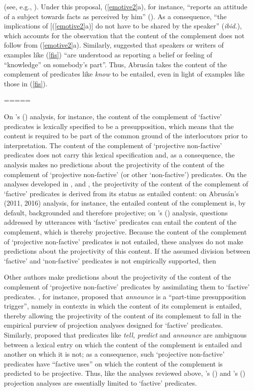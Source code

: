 \documentclass[11pt,fleqn]{article}
\newcommand{\6}{\mbox{$[\hspace*{-.6mm}[$}}
\newcommand{\9}{\mbox{$]\hspace*{-.6mm}]$}}
\newcommand{\citetpos}[1]{\citeauthor{#1}'s (\citeyear{#1})}
\begin{document}
{ (see, e.g., \citealt{eckardt2014}). Under this proposal, (\ref{emotive2}a), for instance, ``reports an attitude of a subject towards facts as perceived by him'' (\citealt[514]{abrusan2011}). As a consequence, ``the implications of [(\ref{emotive2}a)] do not have to be shared by the speaker''  ({\em ibid.}), which accounts for the observation that the content of the complement does not follow from (\ref{emotive2}a). Similarly, \citet[515]{abrusan2011} suggested that speakers or writers of examples like (\ref{fis}) ``are understood as reporting a belief or feeling of ``knowledge'' on somebody's part''. Thus, Abrus\'an takes the content of the complement of predicates like {\em know} to be entailed, even in light of examples like those in (\ref{fis}). 
 
 =====

On \citetpos{heim83} analysis, for instance, the content of the complement of `factive' predicates is lexically specified to be a presupposition, which means that the content is required to be part of the common ground of the interlocutors prior to interpretation. The content of the complement of `projective non-factive' predicates does not carry this lexical specification and, as a consequence, the analysis makes no predictions about the projectivity of the content of the complement of `projective non-factive' (or other `non-factive') predicates. On the analyses developed in \citealt{abrusan2011,abrusan2016}, \citealt{romoli2015} and \citealt{best-question}, the projectivity of the content of the complement of `factive' predicates is derived from its status as entailed content: on Abrus\'an's (2011, 2016) analysis, for instance, the entailed content of the complement is, by default, backgrounded and therefore projective; on \citetpos{best-question} analysis, questions addressed by utterances with `factive' predicates can entail the content of the complement, which is thereby projective. Because the content of the complement of  `projective non-factive' predicates is not entailed, these analyses do not make predictions about the projectivity of this content. If the assumed division between `factive' and `non-factive' predicates is not empirically supported, then 

Other authors make predictions about the projectivity of the content of the complement of `projective non-factive' predicates by assimilating them to `factive' predicates. \citet[139]{schlenker10}, for instance, proposed that {\em announce} is a ``part-time presupposition trigger'', namely in contexts in which the content of its complement is entailed, thereby allowing the projectivity of the content of its complement to fall in the empirical purview of projection analyses designed for `factive' predicates. Similarly, \citet[1736]{spector-egre2015} proposed that predicates like {\em tell, predict} and {\em announce}  are ambiguous between a lexical entry on which the content of the complement is entailed and another on which it is not; as a consequence, such `projective non-factive' predicates have ``factive uses'' on which the content of the complement is predicted to be projective. Thus, like the analyses reviewed above, \citetpos{schlenker10} and \citetpos{spector-egre2015} projection analyses are essentially limited to `factive' predicates.

}
\end{document}
